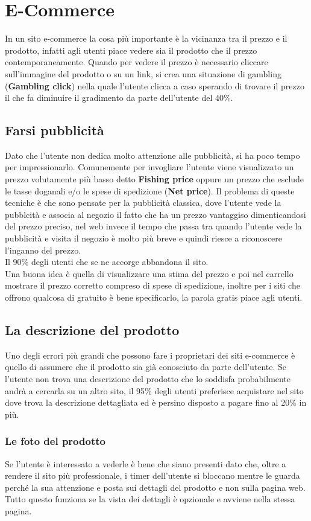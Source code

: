 \section{E-Commerce}
In un sito e-commerce la cosa più importante è la vicinanza tra il prezzo e il prodotto, infatti agli utenti piace vedere sia il prodotto che il prezzo contemporaneamente.
Quando per vedere il prezzo è necessario cliccare sull'immagine del prodotto o su un link, si crea una situazione di gambling (\textbf{Gambling click}) nella quale l'utente clicca a caso sperando di trovare il prezzo il che fa diminuire il gradimento da parte dell'utente del 40\%.

\subsection{Farsi pubblicità}
Dato che l'utente non dedica molto attenzione alle pubblicità, si ha poco tempo per impressionarlo.
Comunemente per invogliare l'utente viene visualizzato un prezzo volutamente più basso detto \textbf{Fishing price} oppure un prezzo che esclude le tasse doganali e/o le spese di spedizione (\textbf{Net price}).
Il problema di queste tecniche è che sono pensate per la pubblicità classica, dove l'utente vede la pubblcità e associa al negozio il fatto che ha un prezzo vantaggiso dimenticandosi del prezzo preciso, nel web invece il tempo che passa tra quando l'utente vede la pubblicità e visita il negozio è molto più breve e quindi riesce a riconoscere l'inganno del prezzo.\\
Il 90\% degli utenti che se ne accorge abbandona il sito.\\
Una buona idea è quella di visualizzare una stima del prezzo e poi nel carrello mostrare il prezzo corretto compreso di spese di spedizione, inoltre per i siti che offrono qualcosa di gratuito è bene specificarlo, la parola gratis piace agli utenti.

\subsection{La descrizione del prodotto}
Uno degli errori più grandi che possono fare i proprietari dei siti e-commerce è quello di assumere che il prodotto sia già conosciuto da parte dell'utente.
Se l'utente non trova una descrizione del prodotto che lo soddisfa probabilmente andrà a cercarla su un altro sito, il 95\% degli utenti preferisce acquistare nel sito dove trova la descrizione dettagliata ed è persino disposto a pagare fino al 20\% in più.

\subsubsection{Le foto del prodotto}
Se l'utente è interessato a vederle è bene che siano presenti dato che, oltre a rendere il sito più professionale, i timer dell'utente si bloccano mentre le guarda perché la sua attenzione e posta sui dettagli del prodotto e non sulla pagina web.
Tutto questo funziona se la vista dei dettagli è opzionale e avviene nella stessa pagina.